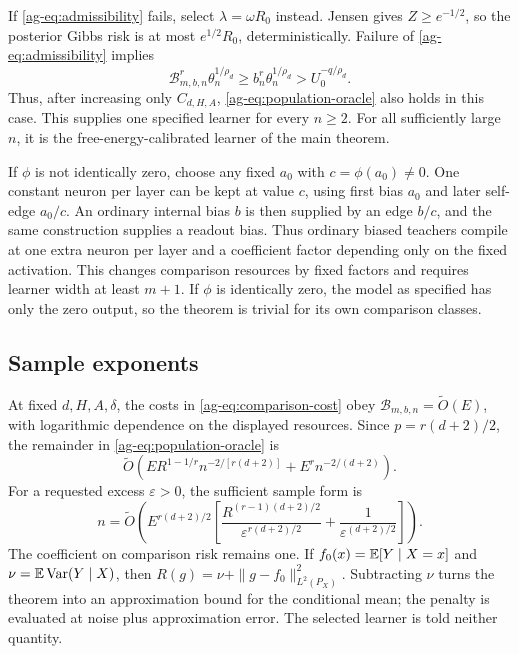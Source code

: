 \begin{remark}
If \eqref{ag-eq:admissibility} fails, select $\lambda=\omega R_0$ instead. Jensen gives $Z\ge e^{-1/2}$, so the posterior Gibbs risk is at most $e^{1/2}R_0$, deterministically. Failure of \eqref{ag-eq:admissibility} implies
\[
 \mathcal B_{m,b,n}^r\theta_n^{1/\rho_d}
 \ge b_n^r\theta_n^{1/\rho_d}
 >U_0^{-q/\rho_d}.
\]
Thus, after increasing only $C_{d,H,A}$, \eqref{ag-eq:population-oracle} also holds in this case. This supplies one specified learner for every $n\ge2$. For all sufficiently large $n$, it is the free-energy-calibrated learner of the main theorem.
\end{remark}

\begin{remark}
If $\phi$ is not identically zero, choose any fixed $a_0$ with $c=\phi(a_0)\ne0$. One constant neuron per layer can be kept at value $c$, using first bias $a_0$ and later self-edge $a_0/c$. An ordinary internal bias $b$ is then supplied by an edge $b/c$, and the same construction supplies a readout bias. Thus ordinary biased teachers compile at one extra neuron per layer and a coefficient factor depending only on the fixed activation. This changes comparison resources by fixed factors and requires learner width at least $m+1$. If $\phi$ is identically zero, the model as specified has only the zero output, so the theorem is trivial for its own comparison classes.
\end{remark}

\subsection{Sample exponents}
At fixed $d,H,A,\delta$, the costs in \eqref{ag-eq:comparison-cost} obey $\mathcal B_{m,b,n}=\widetilde O(E)$, with logarithmic dependence on the displayed resources. Since $p=r(d+2)/2$, the remainder in \eqref{ag-eq:population-oracle} is
\[
 \widetilde O\left(E R^{1-1/r}n^{-2/[r(d+2)]}
                       +E^r n^{-2/(d+2)}\right).
\]
For a requested excess $\varepsilon>0$, the sufficient sample form is
\[
 n=\widetilde O\left(
 E^{r(d+2)/2}
 \left[\frac{R^{(r-1)(d+2)/2}}{\varepsilon^{r(d+2)/2}}
              +\frac1{\varepsilon^{(d+2)/2}}\right]\right).
\]
The coefficient on comparison risk remains one. If $f_0(x)=\mathbb E[Y\mid X=x]$ and $\nu=\mathbb E\operatorname{Var}(Y\mid X)$, then $R(g)=\nu+\|g-f_0\|_{L^2(P_X)}^2$. Subtracting $\nu$ turns the theorem into an approximation bound for the conditional mean; the penalty is evaluated at noise plus approximation error. The selected learner is told neither quantity.
